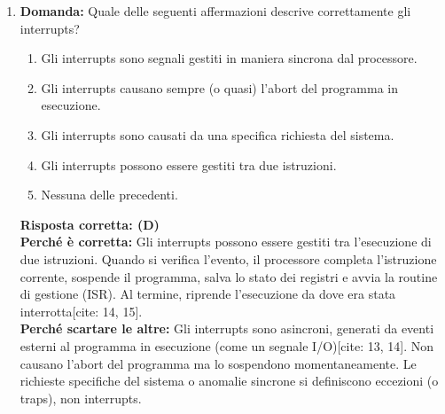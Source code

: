 \documentclass[12pt, a4paper]{article}
\begin{document}
\begin{enumerate}
    \item \textbf{Domanda:} Quale delle seguenti affermazioni descrive correttamente gli interrupts?
    \begin{enumerate}[label=(\Alph*)]
        \item Gli interrupts sono segnali gestiti in maniera sincrona dal processore.
        \item Gli interrupts causano sempre (o quasi) l'abort del programma in esecuzione.
        \item Gli interrupts sono causati da una specifica richiesta del sistema.
        \item Gli interrupts possono essere gestiti tra due istruzioni.
        \item Nessuna delle precedenti.
    \end{enumerate}
    \textbf{Risposta corretta: (D)} \\
    \textbf{Perché è corretta:} Gli interrupts possono essere gestiti tra l'esecuzione di due istruzioni. Quando si verifica l'evento, il processore completa l'istruzione corrente, sospende il programma, salva lo stato dei registri e avvia la routine di gestione (ISR). Al termine, riprende l'esecuzione da dove era stata interrotta[cite: 14, 15]. \\
    \textbf{Perché scartare le altre:} Gli interrupts sono asincroni, generati da eventi esterni al programma in esecuzione (come un segnale I/O)[cite: 13, 14]. Non causano l'abort del programma ma lo sospendono momentaneamente. Le richieste specifiche del sistema o anomalie sincrone si definiscono eccezioni (o traps), non interrupts.


\end{enumerate}
\end{document}
